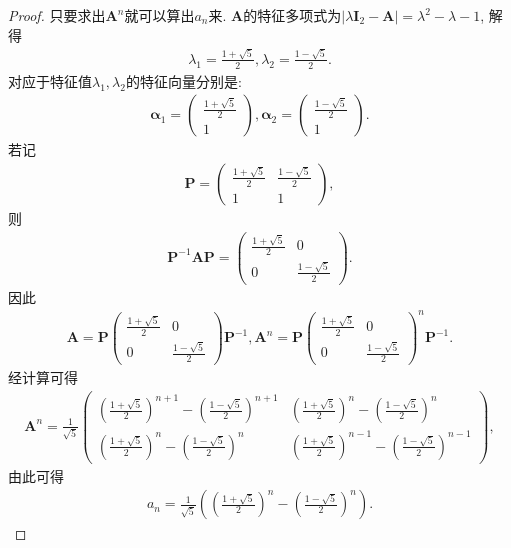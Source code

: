 \documentclass[../../main.tex]{subfiles}
\begin{document}
\begin{proof}
只要求出\(\boldsymbol{A}^{n}\)就可以算出\(a_{n}\)来. \(\boldsymbol{A}\)的特征多项式为\(\vert\lambda\boldsymbol{I}_{2}-\boldsymbol{A}\vert=\lambda^{2}-\lambda - 1\), 解得
\begin{align*}
\lambda_{1}=\frac{1 + \sqrt{5}}{2},\lambda_{2}=\frac{1 - \sqrt{5}}{2}.
\end{align*}
对应于特征值\(\lambda_{1},\lambda_{2}\)的特征向量分别是:
\begin{align*}
\boldsymbol{\alpha}_{1}=\begin{pmatrix}
\frac{1 + \sqrt{5}}{2}\\
1
\end{pmatrix},\boldsymbol{\alpha}_{2}=\begin{pmatrix}
\frac{1 - \sqrt{5}}{2}\\
1
\end{pmatrix}.
\end{align*}
若记
\begin{align*}
\boldsymbol{P}=\begin{pmatrix}
\frac{1 + \sqrt{5}}{2}&\frac{1 - \sqrt{5}}{2}\\
1&1
\end{pmatrix},
\end{align*}
则
\begin{align*}
\boldsymbol{P}^{-1}\boldsymbol{AP}=\begin{pmatrix}
\frac{1 + \sqrt{5}}{2}&0\\
0&\frac{1 - \sqrt{5}}{2}
\end{pmatrix}.
\end{align*}
因此
\begin{align*}
\boldsymbol{A}=\boldsymbol{P}\begin{pmatrix}
\frac{1 + \sqrt{5}}{2}&0\\
0&\frac{1 - \sqrt{5}}{2}
\end{pmatrix}\boldsymbol{P}^{-1},\boldsymbol{A}^{n}=\boldsymbol{P}\begin{pmatrix}
\frac{1 + \sqrt{5}}{2}&0\\
0&\frac{1 - \sqrt{5}}{2}
\end{pmatrix}^{n}\boldsymbol{P}^{-1}.
\end{align*}
经计算可得
\begin{align*}
\boldsymbol{A}^{n}=\frac{1}{\sqrt{5}}\begin{pmatrix}
\left(\frac{1 + \sqrt{5}}{2}\right)^{n + 1}-\left(\frac{1 - \sqrt{5}}{2}\right)^{n + 1}&\left(\frac{1 + \sqrt{5}}{2}\right)^{n}-\left(\frac{1 - \sqrt{5}}{2}\right)^{n}\\
\left(\frac{1 + \sqrt{5}}{2}\right)^{n}-\left(\frac{1 - \sqrt{5}}{2}\right)^{n}&\left(\frac{1 + \sqrt{5}}{2}\right)^{n - 1}-\left(\frac{1 - \sqrt{5}}{2}\right)^{n - 1}
\end{pmatrix},
\end{align*}
由此可得
\begin{align*}
a_{n}=\frac{1}{\sqrt{5}}\left(\left(\frac{1 + \sqrt{5}}{2}\right)^{n}-\left(\frac{1 - \sqrt{5}}{2}\right)^{n}\right).
\end{align*}
\end{proof}
\end{document}
